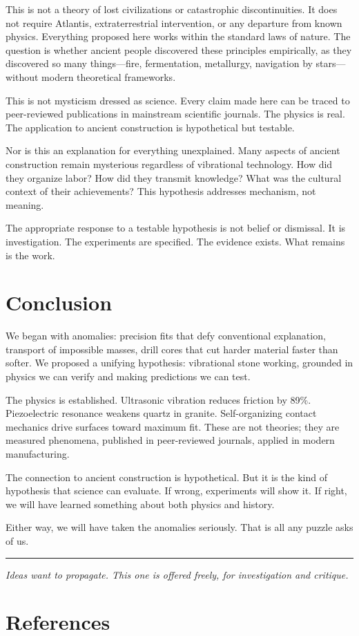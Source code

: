 \documentclass[11pt]{article}
\begin{document}
This is not a theory of lost civilizations or catastrophic discontinuities. It does not require Atlantis, extraterrestrial intervention, or any departure from known physics. Everything proposed here works within the standard laws of nature. The question is whether ancient people discovered these principles empirically, as they discovered so many things---fire, fermentation, metallurgy, navigation by stars---without modern theoretical frameworks.

This is not mysticism dressed as science. Every claim made here can be traced to peer-reviewed publications in mainstream scientific journals. The physics is real. The application to ancient construction is hypothetical but testable.

Nor is this an explanation for everything unexplained. Many aspects of ancient construction remain mysterious regardless of vibrational technology. How did they organize labor? How did they transmit knowledge? What was the cultural context of their achievements? This hypothesis addresses mechanism, not meaning.

The appropriate response to a testable hypothesis is not belief or dismissal. It is investigation. The experiments are specified. The evidence exists. What remains is the work.

\section{Conclusion}

We began with anomalies: precision fits that defy conventional explanation, transport of impossible masses, drill cores that cut harder material faster than softer. We proposed a unifying hypothesis: vibrational stone working, grounded in physics we can verify and making predictions we can test.

The physics is established. Ultrasonic vibration reduces friction by 89\%. Piezoelectric resonance weakens quartz in granite. Self-organizing contact mechanics drive surfaces toward maximum fit. These are not theories; they are measured phenomena, published in peer-reviewed journals, applied in modern manufacturing.

The connection to ancient construction is hypothetical. But it is the kind of hypothesis that science can evaluate. If wrong, experiments will show it. If right, we will have learned something about both physics and history.

Either way, we will have taken the anomalies seriously. That is all any puzzle asks of us.

\vspace{2em}
\hrule
\vspace{1em}

\textit{Ideas want to propagate. This one is offered freely, for investigation and critique.}

\newpage
\section*{References}


\end{document}
